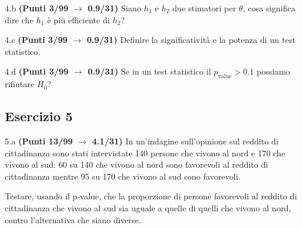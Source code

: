 \documentclass[
  11pt,
]{book}
\theoremstyle{mytheoremstyle}
\theoremstyle{mydefstyle}
\begin{document}
4.b \textbf{(Punti 3/99 \(\rightarrow\) 0.9/31)} Siano \(h_1\) e \(h_2\) due stimatori per \(\theta\), cosa significa dire che \(h_1\) è più efficiente di \(h_2\)?

4.c \textbf{(Punti 3/99 \(\rightarrow\) 0.9/31)} Definire la significatività e la potenza di un test statistico.

4.d \textbf{(Punti 3/99 \(\rightarrow\) 0.9/31)} Se in un test statistico il \(p_\text{value}>0.1\) possiamo rifiutare \(H_0\)?

\subsection{Esercizio 5}\label{esercizio-5-9}

5.a \textbf{(Punti 13/99 \(\rightarrow\) 4.1/31)} In un'indagine sull'opinione sul reddito di cittadinanza sono stati intervistate 140 persone che vivono al nord e 170 che vivono al sud: 60 su 140 che vivono al nord sono favorevoli al reddito di cittadinanza mentre 95 su 170 che vivono al sud sono favorevoli.

Testare, usando il p-value, che la proporzione di persone favorevoli al reddito di cittadinanza che vivono al sud sia uguale a quelle di quelli che vivono al nord, contro l'alternativa che siano diverse.
\end{document}
